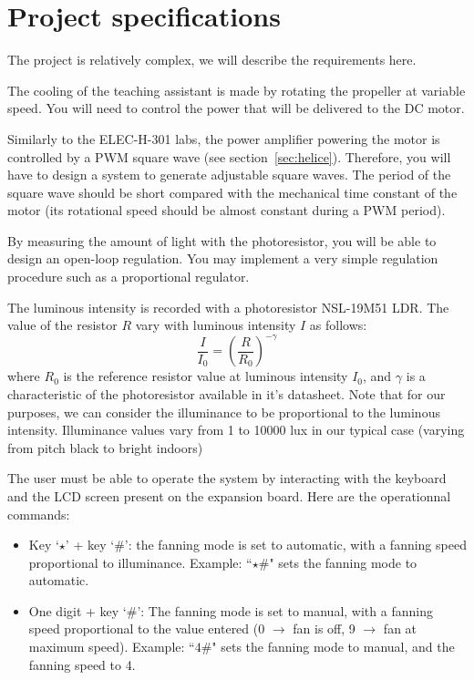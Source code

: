\documentclass[11pt,a4paper]{article}
\theoremstyle{definition}%
\begin{document}



\section{Project specifications}
The project is relatively complex, we will describe the requirements here.

The cooling of the teaching assistant is made by rotating the propeller at variable speed. 
You will need to control the power that will be delivered to the DC motor.

Similarly to the ELEC-H-301 labs, the power amplifier powering the motor is controlled by a PWM square wave (see section~\ref{sec:helice}).
Therefore, you will have to design a system to generate adjustable square waves.
The period of the square wave should be short compared with the mechanical time constant of the motor (its rotational speed should be almost constant during a PWM period).

By measuring the amount of light with the photoresistor, you will be able to design an open-loop regulation.
You may implement a very simple regulation procedure such as a proportional regulator. 

The luminous intensity is recorded with a photoresistor NSL-19M51 LDR. 
The value of the resistor $R$ vary with luminous intensity $I$ as follows: 
\begin{equation}
\frac{I}{I_0} = \left(\frac{R}{R_0}\right)^{-\gamma}
\end {equation}
where $R_0$ is the reference resistor value at luminous intensity $I_0$, and $\gamma$ is a characteristic of the photoresistor available in it's datasheet. Note that for our purposes, we can consider the illuminance to be proportional to the luminous intensity. Illuminance values vary from 1 to 10000 lux in our typical case (varying from pitch black to bright indoors)



The user must be able to operate the system by interacting with the keyboard and the LCD screen present on the expansion board.
Here are the operationnal commands:
\begin{itemize}
	\item Key `$\star$' + key `$\#$': the fanning mode is set to automatic, with a fanning speed proportional to illuminance.
	Example: ``$\star\#$" sets the fanning mode to automatic.
	\item One digit + key `$\#$': The fanning mode is set to manual, with a fanning speed proportional to the value entered (0 $\rightarrow$ fan is off, 9 $\rightarrow$ fan at maximum speed).
	Example: ``$4\#$" sets the fanning mode to manual, and the fanning speed to 4.
\end{itemize}
\end{document}
